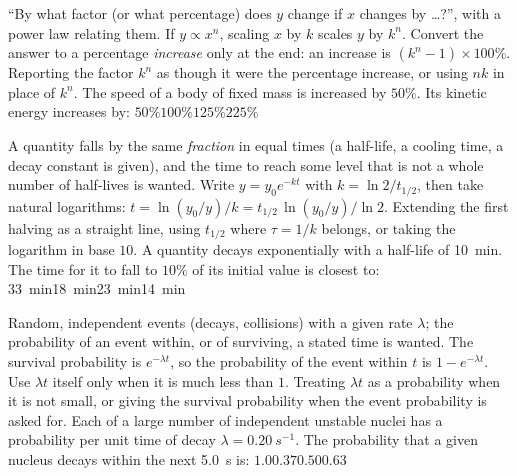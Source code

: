 {``By what factor (or what percentage) does $y$ change if $x$ changes by \ldots?'', with a power law
relating them.}
{If $y\propto x^n$, scaling $x$ by $k$ scales $y$ by $k^n$. Convert the answer to a percentage
\emph{increase} only at the end: an increase is $(k^n-1)\times100\%$.}
{Reporting the factor $k^n$ as though it were the percentage increase, or using $nk$ in place of $k^n$.}
{The speed of a body of fixed mass is increased by $50\%$. Its kinetic energy increases by:}
{$50\%$}{$100\%$}{$125\%$}{$225\%$}

{A quantity falls by the same \emph{fraction} in equal times (a half-life, a cooling time, a decay
constant is given), and the time to reach some level that is not a whole number of half-lives is wanted.}
{Write $y=y_0e^{-kt}$ with $k=\ln2/t_{1/2}$, then take natural logarithms: $t=\ln(y_0/y)/k
=t_{1/2}\,\ln(y_0/y)/\ln2$.}
{Extending the first halving as a straight line, using $t_{1/2}$ where $\tau=1/k$ belongs, or taking the
logarithm in base $10$.}
{A quantity decays exponentially with a half-life of \SI{10}{min}. The time for it to fall to $10\%$ of
its initial value is closest to:}
{\SI{33}{min}}{\SI{18}{min}}{\SI{23}{min}}{\SI{14}{min}}

{Random, independent events (decays, collisions) with a given rate $\lambda$; the probability of an event
within, or of surviving, a stated time is wanted.}
{The survival probability is $e^{-\lambda t}$, so the probability of the event within $t$ is
$1-e^{-\lambda t}$. Use $\lambda t$ itself only when it is much less than $1$.}
{Treating $\lambda t$ as a probability when it is not small, or giving the survival probability when the
event probability is asked for.}
{Each of a large number of independent unstable nuclei has a probability per unit time of decay
$\lambda=\SI{0.20}{s^{-1}}$. The probability that a given nucleus decays within the next \SI{5.0}{s} is:}
{$1.0$}{$0.37$}{$0.50$}{$0.63$}
